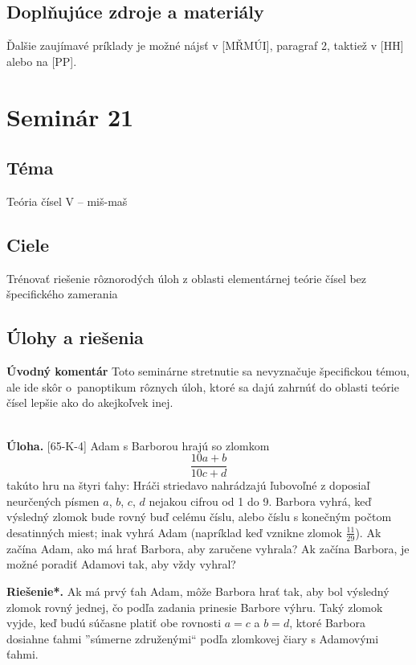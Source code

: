 \documentclass[11pt,a4paper,oneside,final]{book}
\newcommand{\ul}{\textbf{Úloha.} }
\newcommand{\rieh}{\textbf{Riešenie*.} }
\begin{document}
\subsection*{Doplňujúce zdroje a materiály}
Ďalšie zaujímavé príklady je možné nájsť v [MŘMÚI], paragraf 2, taktiež v [HH] alebo na [PP].

\newpage
\section*{Seminár 21}
\subsection*{Téma}
Teória čísel V -- miš-maš
\subsection*{Ciele}
Trénovať riešenie rôznorodých úloh z oblasti elementárnej teórie čísel bez špecifického zamerania

\subsection*{Úlohy a riešenia}
\textbf{Úvodný komentár}
Toto seminárne stretnutie sa nevyznačuje špecifickou témou, ale ide skôr o~panoptikum rôznych úloh, ktoré sa dajú zahrnúť do oblasti teórie čísel lepšie ako do akejkoľvek inej.\\
\\
\begin{tcolorbox}[breakable,notitle,boxrule=0pt,colback=light-gray,colframe=light-gray]\ul [65-K-4]
Adam s Barborou hrajú so zlomkom
$$ \frac{10a + b}{10c + d}$$
takúto hru na štyri ťahy: Hráči striedavo nahrádzajú ľubovoľné z doposiaľ neurčených písmen $a$, $b$, $c$, $d$ nejakou cifrou od 1 do 9. Barbora vyhrá, keď výsledný zlomok bude rovný buď celému číslu, alebo číslu s konečným počtom desatinných miest; inak vyhrá Adam (napríklad keď vznikne zlomok $\frac{11}{29}$). Ak začína Adam, ako má hrať Barbora, aby zaručene vyhrala? Ak začína Barbora, je možné poradiť Adamovi tak, aby vždy vyhral?

\end{tcolorbox}

\rieh Ak má prvý ťah Adam, môže Barbora hrať tak, aby bol výsledný zlomok rovný jednej, čo podľa zadania prinesie Barbore výhru. Taký zlomok vyjde, keď budú súčasne platiť obe rovnosti $a = c$ a $b = d$, ktoré Barbora dosiahne ťahmi ”súmerne združenými“ podľa zlomkovej čiary s Adamovými ťahmi.
\end{document}

